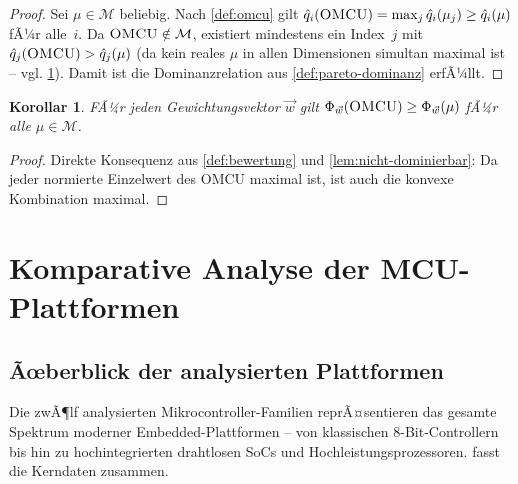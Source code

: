 ﻿\documentclass[12pt, a4paper]{article}
\theoremstyle{plain}
\newtheorem{korollar}[theorem]{Korollar}
\theoremstyle{definition}
\theoremstyle{remark}
\newcommand{\omcu}{\textsc{OMCU}}
\begin{document}
\begin{proof}
  Sei $\mu \in \mathcal{M}$ beliebig.
  Nach \cref{def:omcu} gilt $\hat{q}_i(\omcu{}) = \max_j \hat{q}_i(\mu_j)
  \ge \hat{q}_i(\mu)$ fÃ¼r alle~$i$.
  Da $\omcu{} \notin \mathcal{M}$, existiert mindestens ein Index~$j$ mit
  $\hat{q}_j(\omcu{}) > \hat{q}_j(\mu)$ (da kein reales $\mu$ in allen
  Dimensionen simultan maximal ist -- vgl. \cref{sec:analyse}).
  Damit ist die Dominanzrelation aus \cref{def:pareto-dominanz} erfÃ¼llt.
\end{proof}

\begin{korollar}
\label{kor:phi-max}
  FÃ¼r jeden Gewichtungsvektor $\vec{w}$ gilt
  $\Phi_{\vec{w}}(\omcu{}) \ge \Phi_{\vec{w}}(\mu)$
  fÃ¼r alle $\mu \in \mathcal{M}$.
\end{korollar}

\begin{proof}
  Direkte Konsequenz aus \cref{def:bewertung} und \cref{lem:nicht-dominierbar}:
  Da jeder normierte Einzelwert des \omcu{} maximal ist, ist auch die konvexe
  Kombination maximal.
\end{proof}

\section{Komparative Analyse der MCU-Plattformen}
\label{sec:analyse}

\subsection{Ãœberblick der analysierten Plattformen}

Die zwÃ¶lf analysierten Mikrocontroller-Familien reprÃ¤sentieren das gesamte
Spektrum moderner Embedded-Plattformen -- von klassischen 8-Bit-Controllern
bis hin zu hochintegrierten drahtlosen SoCs und Hochleistungsprozessoren.
 fasst die Kerndaten zusammen.
\end{document}
